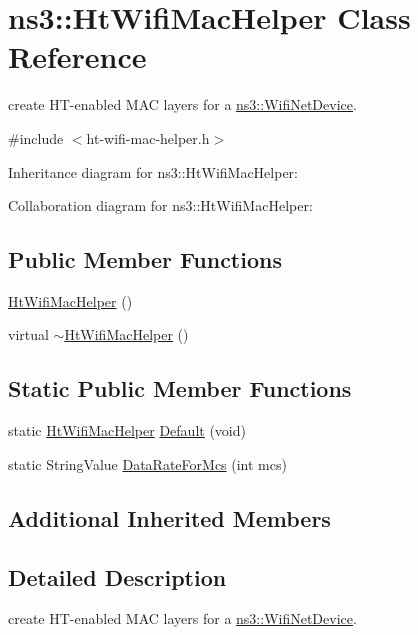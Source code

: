 \hypertarget{classns3_1_1HtWifiMacHelper}{}\section{ns3\+:\+:Ht\+Wifi\+Mac\+Helper Class Reference}
\label{classns3_1_1HtWifiMacHelper}


create H\+T-\/enabled M\+AC layers for a \hyperlink{classns3_1_1WifiNetDevice}{ns3\+::\+Wifi\+Net\+Device}.  




{\ttfamily \#include $<$ht-\/wifi-\/mac-\/helper.\+h$>$}



Inheritance diagram for ns3\+:\+:Ht\+Wifi\+Mac\+Helper\+:


Collaboration diagram for ns3\+:\+:Ht\+Wifi\+Mac\+Helper\+:
\subsection*{Public Member Functions}
\begin{DoxyCompactItemize}
\item 
\hyperlink{classns3_1_1HtWifiMacHelper_a4dc4d62ade34b1958958c518db17673b}{Ht\+Wifi\+Mac\+Helper} ()
\item 
virtual \hyperlink{classns3_1_1HtWifiMacHelper_aef0a78cf1ec367cdf5d24484a3720c9f}{$\sim$\+Ht\+Wifi\+Mac\+Helper} ()
\end{DoxyCompactItemize}
\subsection*{Static Public Member Functions}
\begin{DoxyCompactItemize}
\item 
static \hyperlink{classns3_1_1HtWifiMacHelper}{Ht\+Wifi\+Mac\+Helper} \hyperlink{classns3_1_1HtWifiMacHelper_a4523eb49604799af3c48f9dbc2baa95b}{Default} (void)
\item 
static String\+Value \hyperlink{classns3_1_1HtWifiMacHelper_a23fe615f61058400d2fc019013d2b02b}{Data\+Rate\+For\+Mcs} (int mcs)
\end{DoxyCompactItemize}
\subsection*{Additional Inherited Members}


\subsection{Detailed Description}
create H\+T-\/enabled M\+AC layers for a \hyperlink{classns3_1_1WifiNetDevice}{ns3\+::\+Wifi\+Net\+Device}. 

